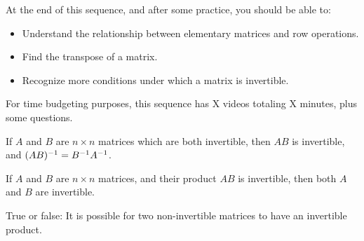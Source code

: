 







At the end of this sequence, and after some practice, you should be able to:

\begin{itemize}
\item Understand the relationship between elementary matrices and row operations.  
\item Find the transpose of a matrix.  
\item Recognize more conditions under which a matrix is invertible.   
\end{itemize}


For time budgeting purposes, this sequence has X videos totaling X minutes, 
plus some questions.  




\endedxtext

\endedxvertical







{}  
If $A$ and $B$ are $n\times n$ matrices which are both invertible, then $AB$ is invertible, and 
$(AB)^{-1} = B^{-1} A^{-1}$. 


{}  If $A$ and $B$ are $n\times n$ matrices, and their product $AB$ is invertible, then
both $A$ and $B$ are invertible.  

\endedxtext




\endedxvertical







True or false: It is possible for two non-invertible matrices to have an invertible product.  




